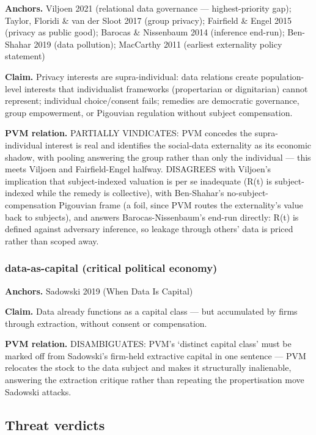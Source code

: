 \documentclass[
  11pt,
]{article}
\begin{document}
\textbf{Anchors.} Viljoen 2021 (relational data governance ---
highest-priority gap); Taylor, Floridi \& van der Sloot 2017 (group
privacy); Fairfield \& Engel 2015 (privacy as public good); Barocas \&
Nissenbaum 2014 (inference end-run); Ben-Shahar 2019 (data pollution);
MacCarthy 2011 (earliest externality policy statement)

\textbf{Claim.} Privacy interests are supra-individual: data relations
create population-level interests that individualist frameworks
(propertarian or dignitarian) cannot represent; individual
choice/consent fails; remedies are democratic governance, group
empowerment, or Pigouvian regulation without subject compensation.

\textbf{PVM relation.} PARTIALLY VINDICATES: PVM concedes the
supra-individual interest is real and identifies the social-data
externality as its economic shadow, with pooling answering the group
rather than only the individual --- this meets Viljoen and
Fairfield-Engel halfway. DISAGREES with Viljoen's implication that
subject-indexed valuation is per se inadequate (R(t) is subject-indexed
while the remedy is collective), with Ben-Shahar's
no-subject-compensation Pigouvian frame (a foil, since PVM routes the
externality's value back to subjects), and answers Barocas-Nissenbaum's
end-run directly: R(t) is defined against adversary inference, so
leakage through others' data is priced rather than scoped away.

\subsubsection{data-as-capital (critical political
economy)}\label{data-as-capital-critical-political-economy}

\textbf{Anchors.} Sadowski 2019 (When Data Is Capital)

\textbf{Claim.} Data already functions as a capital class --- but
accumulated by firms through extraction, without consent or
compensation.

\textbf{PVM relation.} DISAMBIGUATES: PVM's `distinct capital class'
must be marked off from Sadowski's firm-held extractive capital in one
sentence --- PVM relocates the stock to the data subject and makes it
structurally inalienable, answering the extraction critique rather than
repeating the propertisation move Sadowski attacks.

\subsection{Threat verdicts}\label{threat-verdicts}
\end{document}

